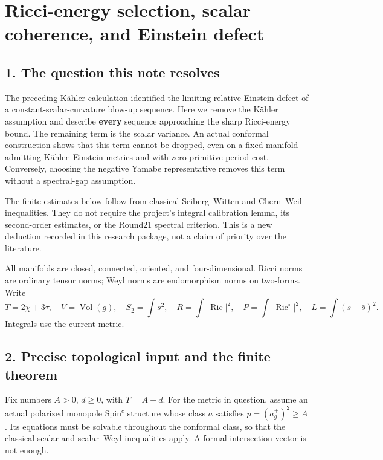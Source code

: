 \documentclass[
  11pt,
]{article}
\author{}
\date{23 September 2026}
\begin{document}
\hypertarget{ricci-energy-selection-scalar-coherence-and-einstein-defect}{%
\section{Ricci-energy selection, scalar coherence, and Einstein
defect}\label{ricci-energy-selection-scalar-coherence-and-einstein-defect}}

\hypertarget{the-question-this-note-resolves}{%
\subsection{1. The question this note
resolves}\label{the-question-this-note-resolves}}

The preceding Kähler calculation identified the limiting relative
Einstein defect of a constant-scalar-curvature blow-up sequence. Here we
remove the Kähler assumption and describe \textbf{every} sequence
approaching the sharp Ricci-energy bound. The remaining term is the
scalar variance. An actual conformal construction shows that this term
cannot be dropped, even on a fixed manifold admitting Kähler--Einstein
metrics and with zero primitive period cost. Conversely, choosing the
negative Yamabe representative removes this term without a spectral-gap
assumption.

The finite estimates below follow from classical Seiberg--Witten and
Chern--Weil inequalities. They do not require the project's integral
calibration lemma, its second-order estimates, or the Round21 spectral
criterion. This is a new deduction recorded in this research package,
not a claim of priority over the literature.

All manifolds are closed, connected, oriented, and four-dimensional.
Ricci norms are ordinary tensor norms; Weyl norms are endomorphism norms
on two-forms. Write \[
 T=2\chi+3\tau,\quad V=\operatorname{Vol}(g),\quad
 S_2=\int s^2,\quad R=\int|\operatorname{Ric}|^2,\quad
 P=\int|\operatorname{Ric}^{\circ}|^2,\quad
 L=\int(s-\bar s)^2.
 \tag{1}
\] Integrals use the current metric.

\hypertarget{precise-topological-input-and-the-finite-theorem}{%
\subsection{2. Precise topological input and the finite
theorem}\label{precise-topological-input-and-the-finite-theorem}}

Fix numbers \(A>0\), \(d\ge0\), with \(T=A-d\). For the metric in
question, assume an actual polarized monopole Spin\(^c\) structure whose
class \(a\) satisfies \(p=(a_g^+)^2\ge A\). Its equations must be
solvable throughout the conformal class, so that the classical scalar
and scalar--Weyl inequalities apply. A formal intersection vector is not
enough.
\end{document}
